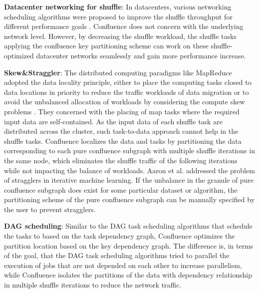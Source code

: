 \documentclass[10pt,journal,compsoc]{IEEEtran}
\begin{document}
\textbf{Datacenter networking for shuffle}: 
In datacenters, various networking scheduling algorithms were proposed to improve the shuffle throughput for different performance goals \cite{greenberg2009vl2,popa2012faircloud,shieh2011sharing,chowdhury2011managing}.  
Confluence does not concern with the underlying network level. However, by decreasing the shuffle workload, the shuffle tasks applying the confluence key partitioning scheme can work on these shuffle-optimized datacenter networks seamlessly and gain more performance increase.    

\textbf{Skew\&Straggler}: 
The distributed computing paradigms like MapReduce adopted the data locality principle, either to place the computing tasks closed to data locations in priority to reduce the traffic workloads of data migration \cite{dean2008mapreduce, zaharia2008improving} or to avoid the unbalanced allocation of workloads by considering the compute skew problems \cite{kwon2010skew, kwon2012skewtune}. 
They concerned with the placing of map tasks where the required input data are self-contained.
As the input data of each shuffle task are distributed across the cluster, such task-to-data approach cannot help in the shuffle tasks. 
Confluence localizes the data and tasks by partitioning the data corresponding to each pure confluence subgraph with multiple shuffle iterations in the same node, which eliminates the shuffle traffic of the following iterations while not impacting the balance of workloads.
Aaron et al. \cite{Harlap:2016:ASP} addressed the problem of stragglers in iterative machine learning. If the unbalance in the granule of pure confluence subgraph does exist for some particular dataset or algorithm, the partitioning scheme of the pure confluence subgraph can be manually specified by the user to prevent stragglers. 

\textbf{DAG scheduling}: 
Similar to the DAG task scheduling algorithms \cite{sakellariou2004hybrid, zhao2006scheduling, spark-dagscheduler, isard2007dryad} that schedule the tasks to based on the task dependency graph, Confluence optimizes the partition location based on the key dependency graph. 
The difference is, in terms of the goal, that the DAG task scheduling algorithms tried to parallel the execution of jobs that are not depended on each other to increase parallelism, while Confluence isolates the partitions of the data with dependency relationship in multiple shuffle iterations to reduce the network traffic. 
\end{document}
